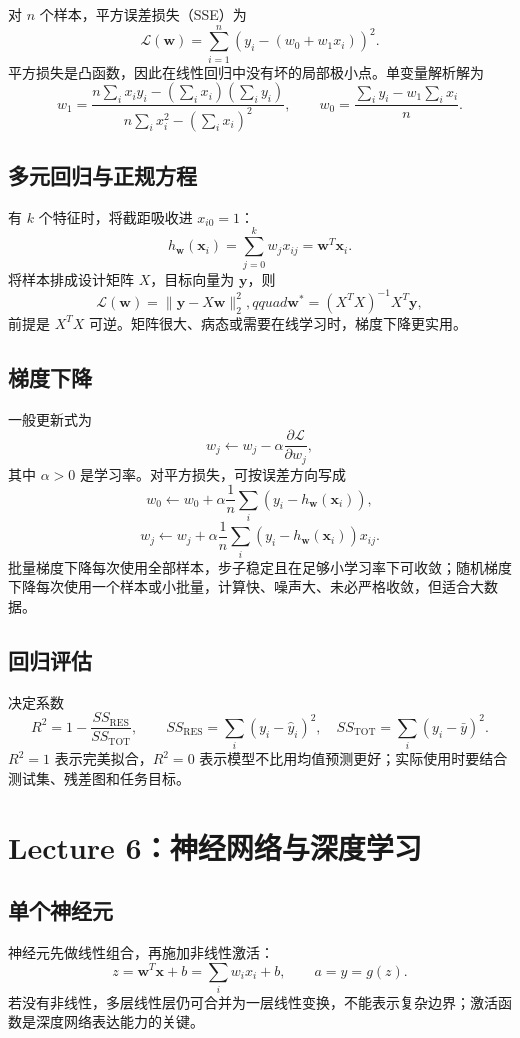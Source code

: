 \documentclass[UTF8,11pt,a4paper]{ctexart}
\newcommand{\loss}{\mathcal{L}}\newcommand{\softmax}{\operatorname{softmax}}\newcommand{\sigmoid}{\operatorname{sigmoid}}
\begin{document}
对 $n$ 个样本，平方误差损失（SSE）为
\[
\loss(\bm w)=\sum_{i=1}^{n}\left(y_i-(w_0+w_1x_i)\right)^2.
\]
平方损失是凸函数，因此在线性回归中没有坏的局部极小点。单变量解析解为
\[
w_1=\frac{n\sum_i x_i y_i-(\sum_i x_i)(\sum_i y_i)}{n\sum_i x_i^2-(\sum_i x_i)^2},\qquad
w_0=\frac{\sum_i y_i-w_1\sum_i x_i}{n}.
\]

\subsection{多元回归与正规方程}
有 $k$ 个特征时，将截距吸收进 $x_{i0}=1$：
\[
h_{\bm w}(\bm x_i)=\sum_{j=0}^{k}w_jx_{ij}=\bm w^T\bm x_i.
\]
将样本排成设计矩阵 $X$，目标向量为 $\bm y$，则
\[
\loss(\bm w)=\|\bm y-X\bm w\|_2^2,qquad
\bm w^*=(X^TX)^{-1}X^T\bm y,
\]
前提是 $X^TX$ 可逆。矩阵很大、病态或需要在线学习时，梯度下降更实用。

\subsection{梯度下降}
一般更新式为
\[
w_j\leftarrow w_j-\alpha\frac{\partial\loss}{\partial w_j},
\]
其中 $\alpha>0$ 是学习率。对平方损失，可按误差方向写成
\[
w_0\leftarrow w_0+\alpha\frac1n\sum_i(y_i-h_{\bm w}(\bm x_i)),
\]
\[
w_j\leftarrow w_j+\alpha\frac1n\sum_i(y_i-h_{\bm w}(\bm x_i))x_{ij}.
\]
批量梯度下降每次使用全部样本，步子稳定且在足够小学习率下可收敛；随机梯度下降每次使用一个样本或小批量，计算快、噪声大、未必严格收敛，但适合大数据。

\subsection{回归评估}
决定系数
\[
R^2=1-\frac{SS_{\mathrm{RES}}}{SS_{\mathrm{TOT}}},\qquad
SS_{\mathrm{RES}}=\sum_i(y_i-\hat y_i)^2,\quad
SS_{\mathrm{TOT}}=\sum_i(y_i-\bar y)^2.
\]
$R^2=1$ 表示完美拟合，$R^2=0$ 表示模型不比用均值预测更好；实际使用时要结合测试集、残差图和任务目标。

\section{Lecture 6：神经网络与深度学习}
\subsection{单个神经元}
神经元先做线性组合，再施加非线性激活：
\[
z=\bm w^T\bm x+b=\sum_iw_ix_i+b,\qquad a=y=g(z).
\]
若没有非线性，多层线性层仍可合并为一层线性变换，不能表示复杂边界；激活函数是深度网络表达能力的关键。
\end{document}
